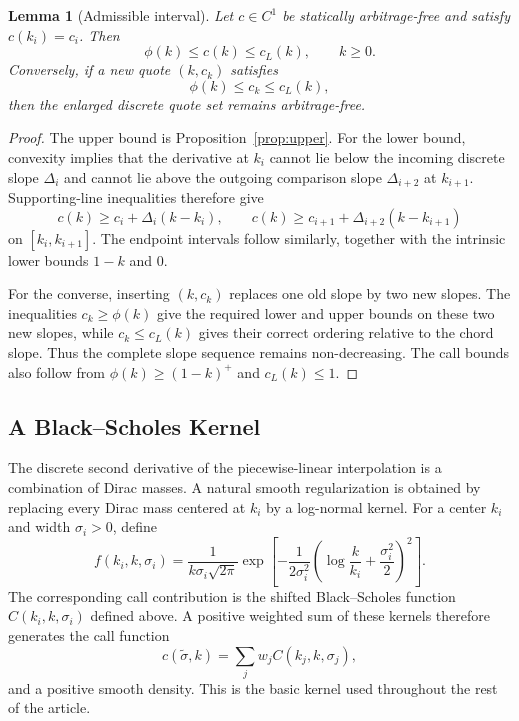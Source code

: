 \documentclass[11pt]{article}
\newtheorem{lemma}[theorem]{Lemma}
\begin{document}
\begin{lemma}[Admissible interval]\label{lem:admissible}
Let $c\in C^1$ be statically arbitrage-free and satisfy $c(k_i)=c_i$. Then
\[
\phi(k)\le c(k)\le c_L(k),\qquad k\ge0.
\]
Conversely, if a new quote $(k,c_k)$ satisfies
\[
\phi(k)\le c_k\le c_L(k),
\]
then the enlarged discrete quote set remains arbitrage-free.
\end{lemma}

\begin{proof}
The upper bound is Proposition~\ref{prop:upper}. For the lower bound, convexity implies that the derivative at $k_i$ cannot lie below the incoming discrete slope $\Delta_i$ and cannot lie above the outgoing comparison slope $\Delta_{i+2}$ at $k_{i+1}$. Supporting-line inequalities therefore give
\[
c(k)\ge c_i+\Delta_i(k-k_i),\qquad
c(k)\ge c_{i+1}+\Delta_{i+2}(k-k_{i+1})
\]
on $[k_i,k_{i+1}]$. The endpoint intervals follow similarly, together with the intrinsic lower bounds $1-k$ and $0$.

For the converse, inserting $(k,c_k)$ replaces one old slope by two new slopes. The inequalities $c_k\ge\phi(k)$ give the required lower and upper bounds on these two new slopes, while $c_k\le c_L(k)$ gives their correct ordering relative to the chord slope. Thus the complete slope sequence remains non-decreasing. The call bounds also follow from $\phi(k)\ge(1-k)^+$ and $c_L(k)\le1$.
\end{proof}

\subsection{A Black--Scholes Kernel}
The discrete second derivative of the piecewise-linear interpolation is a combination of Dirac masses. A natural smooth regularization is obtained by replacing every Dirac mass centered at $k_i$ by a log-normal kernel. For a center $k_i$ and width $\sigma_i>0$, define
\begin{equation}
f(k_i,k,\sigma_i)=\frac{1}{k\sigma_i\sqrt{2\pi}}
\exp\left[-\frac{1}{2\sigma_i^2}\left(\log\frac{k}{k_i}+\frac{\sigma_i^2}{2}\right)^2\right].
\end{equation}
The corresponding call contribution is the shifted Black--Scholes function $C(k_i,k,\sigma_i)$ defined above. A positive weighted sum of these kernels therefore generates the call function
\begin{equation}
c(\widetilde{\sigma},k)=\sum_j w_j C(k_j,k,\sigma_j),
\end{equation}
and a positive smooth density. This is the basic kernel used throughout the rest of the article.
\end{document}
